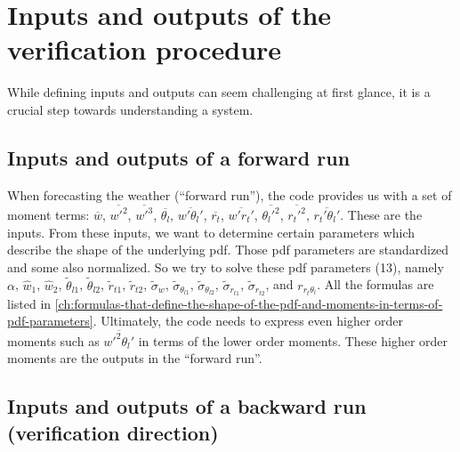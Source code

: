 \section{Inputs and outputs of the verification procedure}
\label{sec:inputs-and-outputs-of-the-verification-procedure}

While defining inputs and outputs can seem challenging at first glance,
it is a crucial step towards understanding a system.

\subsection{Inputs and outputs of a forward run}
\label{subsec:inputs-and-outputs-of-a-forward-run}

When forecasting the weather (\enquote{forward run}),
the code provides us with a set of moment terms:
$\overline{w}$, $\overline{w'^2}$, $\overline{w'^3}$, $\overline{\theta_l}$, $\overline{w'\theta_l'}$,
$\overline{r_t}$, $\overline{w' r_t'}$, $\overline{\theta_l'^2}$, $\overline{r_t'^2}$, $\overline{r_t'\theta_l'}$.
These are the inputs.
From these inputs,
we want to determine certain parameters which describe the shape of the underlying \gls{pdf}.
Those \gls{pdf} parameters are standardized and some also normalized.
So we try to solve these \gls{pdf} parameters (13),
namely $\alpha$, $\widehat{w}_1$, $\widehat{w}_2$, $\tilde{\theta}_{l1}$, $\tilde{\theta}_{l2}$, $\tilde{r}_{t1}$,
$\tilde{r}_{t2}$, $\tilde{\sigma}_w$, $\tilde{\sigma}_{\theta_{l1}}$, $\tilde{\sigma}_{\theta_{l2}}$,
$\tilde{\sigma}_{r_{t1}}$, $\tilde{\sigma}_{r_{t2}}$, and $r_{r_t \theta_l}$.
All the formulas are listed in \cref{ch:formulas-that-define-the-shape-of-the-pdf-and-moments-in-terms-of-pdf-parameters}.
Ultimately, the code needs to express even higher order moments such as $\overline{w'^2 \theta_l'}$
in terms of the lower order moments.
These higher order moments are the outputs in the \enquote{forward run}.

\subsection{Inputs and outputs of a backward run (verification direction)}
\label{subsec:inputs-and-outputs-of-a-backward-run-(verification-direction)}

